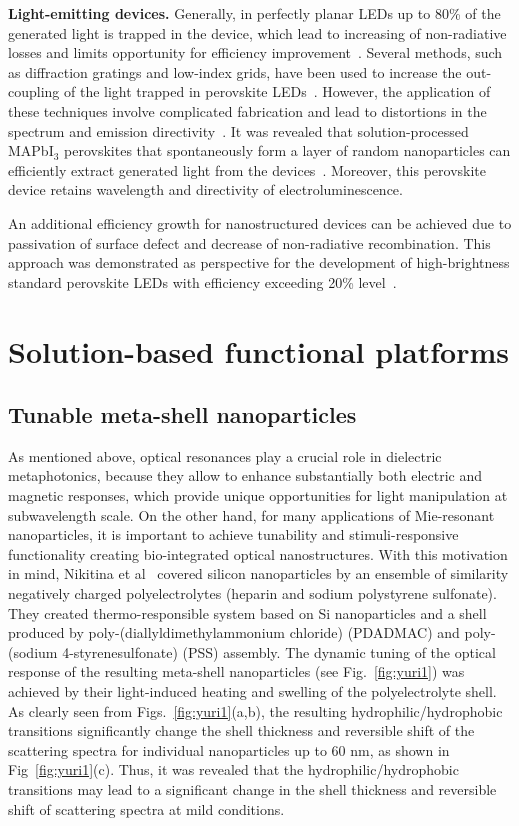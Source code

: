 \documentclass[journal=chreay,manuscript=review]{achemso}
\begin{document}
\textbf{Light-emitting devices.}
Generally, in perfectly planar LEDs up to 80\% of the generated light is trapped in the device, which lead to increasing of non-radiative losses and limits opportunity for efficiency improvement~\cite{lee2003high}. Several methods, such as diffraction gratings and low-index grids, have been used to increase the out-coupling of the light trapped in perovskite LEDs~\citep{richter2016enhancing}. However, the application of these techniques involve complicated fabrication and lead to distortions in the spectrum and emission directivity~\citep{ziebarth2004extracting}. It was revealed that solution-processed MAPbI$_3$ perovskites that spontaneously form a layer of random nanoparticles can efficiently extract generated light from the devices~\cite{cao2018perovskite}. Moreover, this perovskite device retains wavelength and directivity of electroluminescence. 

An additional efficiency growth for nanostructured devices can be achieved due to passivation of surface defect and decrease of non-radiative recombination. This approach was demonstrated as perspective for the development of high-brightness standard perovskite LEDs with efficiency exceeding 20\% level~\cite{xu2019rational,ye2021defect}.


\section{Solution-based functional platforms}

\subsection{Tunable meta-shell nanoparticles}

As mentioned above, optical resonances play a crucial role in dielectric metaphotonics, because they allow to enhance substantially both electric and magnetic responses, which provide unique opportunities for light manipulation at subwavelength scale. On the other hand, for many applications of Mie-resonant nanoparticles, it is important to achieve tunability and stimuli-responsive functionality creating bio-integrated optical nanostructures. With this motivation in mind, Nikitina et al~\cite{nikitina2021all} covered silicon nanoparticles by an ensemble of similarity negatively charged polyelectrolytes (heparin and sodium polystyrene sulfonate). They created thermo-responsible system based on Si nanoparticles and a shell produced by poly-(diallyldimethylammonium chloride) (PDADMAC) and poly-(sodium 4-styrenesulfonate) (PSS) assembly. The dynamic tuning of the optical response of the resulting meta-shell nanoparticles (see Fig.~\ref{fig:yuri1}) was achieved by their light-induced heating and swelling of the polyelectrolyte shell. As clearly seen from Figs.~\ref{fig:yuri1}(a,b), the resulting hydrophilic/hydrophobic transitions significantly change the shell thickness and reversible shift of the scattering spectra for individual nanoparticles up to 60 nm, as shown in Fig~\ref{fig:yuri1}(c). Thus, it was revealed that the hydrophilic/hydrophobic transitions may lead to a significant change in the shell thickness and reversible shift of scattering spectra at mild conditions.
\end{document}
